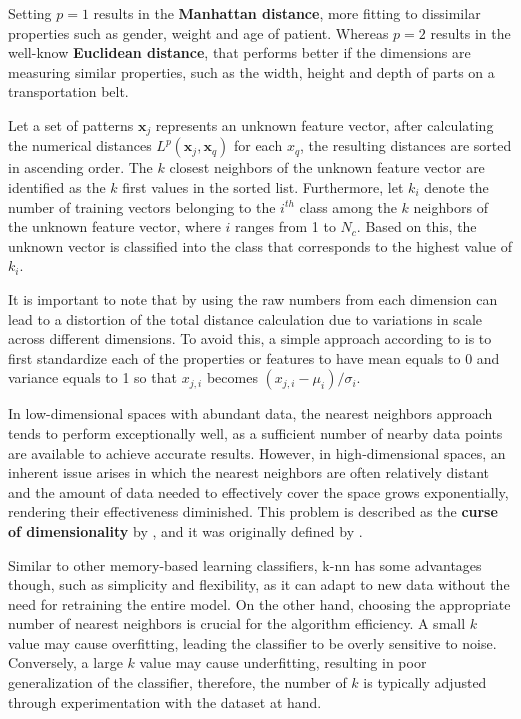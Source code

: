 Setting $p=1$ results in the \textbf{Manhattan distance}, more fitting to dissimilar properties such as gender, weight and age of patient. Whereas $p=2$ results in the well-know \textbf{Euclidean distance}, that performs better if the dimensions are measuring similar properties, such as the width, height and depth of parts on a transportation belt.

Let a set of patterns $\mathbf{x}_j$ represents an unknown feature vector, after calculating the numerical distances $L^p\left(\mathbf{x}_j, \mathbf{x}_q\right)$ for each ${x}_q$, the resulting distances are sorted in ascending order. The $k$ closest neighbors of the unknown feature vector are identified as the $k$ first values in the sorted list. Furthermore, let $k_i$ denote the number of training vectors belonging to the $i^{t h}$ class among the $k$ neighbors of the unknown feature vector, where $i$ ranges from 1 to $N_c$. Based on this, the unknown vector is classified into the class that corresponds to the highest value of $k_i$. 

It is important to note that by using the raw numbers from each dimension can lead to a distortion of the total distance calculation due to variations in scale across different dimensions. To avoid this, a simple approach according to \textcite{Hastie2009} is to first standardize each of the properties or features to have mean equals to 0 and variance equals to 1 so that $x_{j, i}$ becomes $\left(x_{j, i}-\mu_i\right) / \sigma_i$.

 In low-dimensional spaces with abundant data, the nearest neighbors approach tends to perform exceptionally well, as a sufficient number of nearby data points are available to achieve accurate results. However, in high-dimensional spaces, an inherent issue arises in which the nearest neighbors are often relatively distant and the amount of data needed to effectively cover the space grows exponentially, rendering their effectiveness diminished. This problem is described as the \textbf{curse of dimensionality} by \textcite{Russel2010}, \textcite{Hastie2009} and it was originally defined by \textcite{Bellman1961}.

Similar to other memory-based learning classifiers, \gls{k-nn} has some advantages though, such as simplicity and flexibility, as it can adapt to new data without the need for retraining the entire model. On the other hand, choosing the appropriate number of nearest neighbors is crucial for the algorithm efficiency. A small $k$ value may cause overfitting, leading the classifier to be overly sensitive to noise. Conversely, a large $k$ value may cause underfitting, resulting in poor generalization of the classifier, therefore, the number of $k$ is typically adjusted through experimentation with the dataset at hand.


